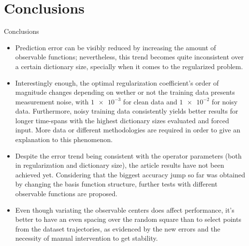 \documentclass{beamer}
\begin{document}
\section{Conclusions}

\begin{frame}[allowframebreaks]{Conclusions}
    \begin{itemize}
        \item Prediction error can be visibly reduced by increasing the amount of observable functions; nevertheless, this trend becomes quite inconsistent over a certain dictionary size, specially when it comes to the regularized problem.
        \item Interestingly enough, the optimal regularization coefficient's order of magnitude changes depending on wether or not the training data presents measurement noise, with $\num{1e-3}$ for clean data and $\num{1e-2}$ for noisy data. Furthermore, noisy training data consistently yields better results for longer time-spans with the highest dictionary sizes evaluated and forced input. More data or different methodologies are required in order to give an explanation to this phenomenon.
        \item Despite the error trend being consistent with the operator parameters (both in regularization and dictionary size), the article results have not been achieved yet. Considering that the biggest accuracy jump so far was obtained by changing the basis function structure, further tests with different observable functions are proposed.
        \item Even though variating the observable centers does affect performance, it's better to have an even spacing over the random square than to select points from the dataset trajectories, as evidenced by the new errors and the necessity of manual intervention to get stability.
    \end{itemize}
\end{frame}
\end{document}

